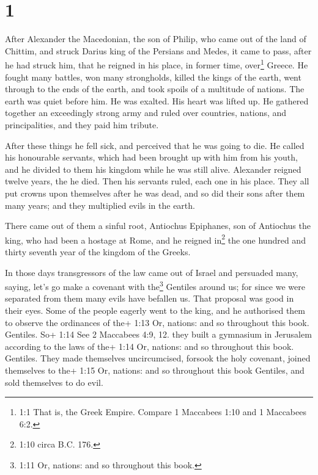 \hypertarget{section}{%
\section{1}\label{section}}

 After Alexander the Macedonian, the son of Philip, who came
out of the land of Chittim, and struck Darius king of the Persians and
Medes, it came to pass, after he had struck him, that he reigned in his
place, in former time, over\footnote{1:1 That is, the Greek Empire.
  Compare 1 Maccabees 1:10 and 1 Maccabees 6:2.} Greece.  He
fought many battles, won many strongholds, killed the kings of the
earth,  went through to the ends of the earth, and took
spoils of a multitude of nations. The earth was quiet before him. He was
exalted. His heart was lifted up.  He gathered together an
exceedingly strong army and ruled over countries, nations, and
principalities, and they paid him tribute.

 After these things he fell sick, and perceived that he was
going to die.  He called his honourable servants, which had
been brought up with him from his youth, and he divided to them his
kingdom while he was still alive.  Alexander reigned twelve
years, the he died.  Then his servants ruled, each one in
his place.  They all put crowns upon themselves after he was
dead, and so did their sons after them many years; and they multiplied
evils in the earth.

 There came out of them a sinful root, Antiochus Epiphanes,
son of Antiochus the king, who had been a hostage at Rome, and he
reigned in\footnote{1:10 circa B.C. 176.} the one hundred and thirty
seventh year of the kingdom of the Greeks.

 In those days transgressors of the law came out of Israel
and persuaded many, saying, let's go make a covenant with the\footnote{1:11
  Or, nations: and so throughout this book.} Gentiles around us; for
since we were separated from them many evils have befallen us.
 That proposal was good in their eyes.  Some
of the people eagerly went to the king, and he authorised them to
observe the ordinances of the+ 1:13 Or, nations: and so throughout this
book. Gentiles.  So+ 1:14 See 2 Maccabees 4:9, 12. they
built a gymnasium in Jerusalem according to the laws of the+ 1:14 Or,
nations: and so throughout this book. Gentiles.  They made
themselves uncircumcised, forsook the holy covenant, joined themselves
to the+ 1:15 Or, nations: and so throughout this book Gentiles, and sold
themselves to do evil.

